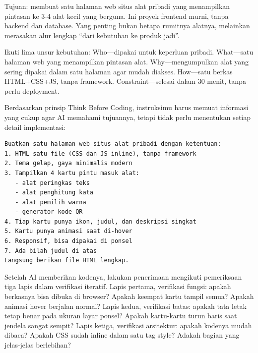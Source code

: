 



Tujuan: membuat satu halaman web situs alat pribadi yang menampilkan pintasan ke 3-4 alat kecil yang berguna. Ini proyek frontend murni, tanpa backend dan database. Yang penting bukan betapa rumitnya alatnya, melainkan merasakan alur lengkap “dari kebutuhan ke produk jadi”.

Ikuti lima unsur kebutuhan: Who—dipakai untuk keperluan pribadi. What—satu halaman web yang menampilkan pintasan alat. Why—mengumpulkan alat yang sering dipakai dalam satu halaman agar mudah diakses. How—satu berkas HTML+CSS+JS, tanpa framework. Constraint—selesai dalam 30 menit, tanpa perlu deployment.


Berdasarkan prinsip Think Before Coding, instruksimu harus memuat informasi yang cukup agar AI memahami tujuannya, tetapi tidak perlu menentukan setiap detail implementasi:

\begin{lstlisting}
Buatkan satu halaman web situs alat pribadi dengan ketentuan:
1. HTML satu file (CSS dan JS inline), tanpa framework
2. Tema gelap, gaya minimalis modern
3. Tampilkan 4 kartu pintu masuk alat:
   - alat peringkas teks
   - alat penghitung kata
   - alat pemilih warna
   - generator kode QR
4. Tiap kartu punya ikon, judul, dan deskripsi singkat
5. Kartu punya animasi saat di-hover
6. Responsif, bisa dipakai di ponsel
7. Ada bilah judul di atas
Langsung berikan file HTML lengkap.
\end{lstlisting}


Setelah AI memberikan kodenya, lakukan penerimaan mengikuti pemeriksaan tiga lapis dalam verifikasi iteratif. Lapis pertama, verifikasi fungsi: apakah berkasnya bisa dibuka di browser? Apakah keempat kartu tampil semua? Apakah animasi hover berjalan normal? Lapis kedua, verifikasi batas: apakah tata letak tetap benar pada ukuran layar ponsel? Apakah kartu-kartu turun baris saat jendela sangat sempit? Lapis ketiga, verifikasi arsitektur: apakah kodenya mudah dibaca? Apakah CSS sudah inline dalam satu tag style? Adakah bagian yang jelas-jelas berlebihan?

